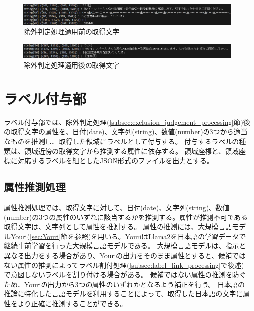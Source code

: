 \begin{figure}[t]
    \begin{center}
        \includegraphics[width=15cm]{image/04-implementation/before_exclusion_string.png}
        \caption{除外判定処理適用前の取得文字}
        \label{fig:before_exclusion_string}
    \end{center}
\end{figure}

\begin{figure}[t]
    \begin{center}
        \includegraphics[width=15cm]{image/04-implementation/after_exclusion_string.png}
        \caption{除外判定処理適用後の取得文字}
        \label{fig:after_exclusion_string}
    \end{center}
\end{figure}


\section{ラベル付与部}\label{sec:label_link_part}
ラベル付与部では、除外判定処理(\ref{subsec:exclusion_judgement_processing}節)後の取得文字の属性を、日付(date)、文字列(string)、数値(number)の3つから適当なものを推測し、取得した領域にラベルとして付与する。
付与するラベルの種類は、領域近傍の取得文字から推測する属性に依存する。
領域座標と、領域座標に対応するラベルを組としたJSON形式のファイルを出力とする。


\subsection{属性推測処理}\label{subsec:att_prediction_processing}
属性推測処理では、取得文字に対して、日付(date)、文字列(string)、数値(number)の3つの属性のいずれに該当するかを推測する。属性が推測不可である取得文字は、文字列として属性を推測する。
属性の推測には、大規模言語モデルYouri(\ref{sec:Youri}節を参照)を用いる。YouriはLlama2を日本語の学習データで継続事前学習を行った大規模言語モデルである。
大規模言語モデルは、指示と異なる出力をする場合があり、Youriの出力をそのまま属性とすると、候補ではない属性の推測によってラベル割付処理(\ref{subsec:label_link_processing}で後述)で意図しないラベルを割り付ける場合がある。
候補ではない属性の推測を防ぐため、Youriの出力から3つの属性のいずれかとなるよう補正を行う。
日本語の推論に特化した言語モデルを利用することによって、取得した日本語の文字に属性をより正確に推測することができる。

